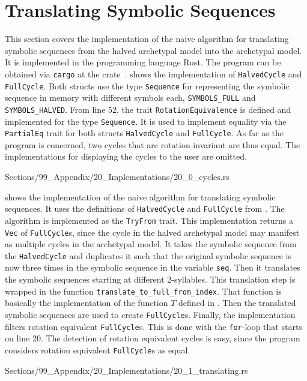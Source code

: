 \section{Translating Symbolic Sequences}

This section covers the implementation of the naive algorithm for translating symbolic sequences from the halved archetypal model into the archetypal model.
It is implemented in the programming language Rust.
The program can be obtained via \texttt{cargo} at the crate~\cite{TranslatingSymbolicCrate}.
 shows the implementation of \texttt{HalvedCycle} and \texttt{FullCycle}.
Both structs use the type \texttt{Sequence} for representing the symbolic sequence in memory with different symbols each, \texttt{SYMBOLS\_FULL} and \texttt{SYMBOLS\_HALVED}.
From line 52, the trait \texttt{RotationEquivalence} is defined and implemented for the type \texttt{Sequence}.
It is used to implement equality via the \texttt{PartialEq} trait for both structs \texttt{HalvedCycle} and \texttt{FullCycle}.
As far as the program is concerned, two cycles that are rotation invariant are thus equal.
The implementations for displaying the cycles to the user are omitted.


{Sections/99_Appendix/20_Implementations/20_0_cycles.rs}

\clearpage
{} shows the implementation of the naive algorithm for translating symbolic sequences.
It uses the definitions of \texttt{HalvedCycle} and \texttt{FullCycle} from .
The algorithm is implemented as the \texttt{TryFrom} trait.
This implementation returns a \texttt{Vec} of \texttt{FullCycle}s, since the cycle in the halved archetypal model may manifest as multiple cycles in the archetypal model.
It takes the symbolic sequence from the \texttt{HalvedCycle} and duplicates it such that the original symbolic sequence is now three times in the symbolic sequence in the variable \texttt{seq}.
Then it translates the symbolic sequences starting at different 2-syllables.
This translation step is wrapped in the function \texttt{translate\_to\_full\_from\_index}.
That function is basically the implementation of the function $T$ defined in .
Then the translated symbolic sequences are used to create \texttt{FullCycle}s.
Finally, the implementation filters rotation equivalent \texttt{FullCycle}s.
This is done with the \texttt{for}-loop that starts on line 20.
The detection of rotation equivalent cycles is easy, since the program considers rotation equivalent \texttt{FullCycle}s as equal.



{Sections/99_Appendix/20_Implementations/20_1_translating.rs}
